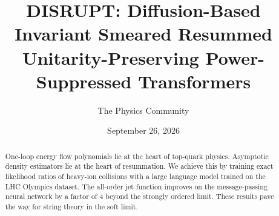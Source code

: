 \documentclass[11pt]{article}
\title{DISRUPT: Diffusion-Based Invariant Smeared Resummed Unitarity-Preserving Power-Suppressed Transformers}
\author{The Physics Community}
\date{September 26, 2026}
\numberwithin{equation}{section}
\theoremstyle{definition}
\theoremstyle{remark}
\begin{document}
\maketitle
\begin{abstract}
One-loop energy flow polynomials lie at the heart of top-quark physics.
Asymptotic density estimators lie at the heart of resummation. We
achieve this by training exact likelihood ratios of heavy-ion collisions
with a large language model trained on the LHC Olympics dataset. The
all-order jet function improves on the message-passing neural network by
a factor of 4 beyond the strongly ordered limit. These results pave the
way for string theory in the soft limit.
\end{abstract}
\tableofcontents





\nocite{*}


\end{document}

